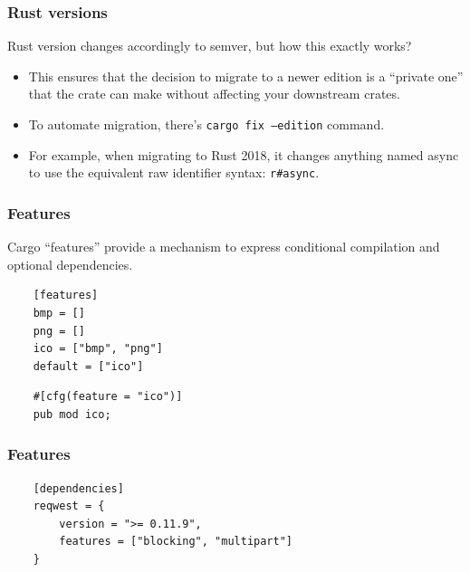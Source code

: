 \documentclass[aspectratio=1610,t]{beamer}
\begin{document}

\begin{frame}[fragile]
\frametitle{Rust versions}
Rust version changes accordingly to semver, but how this exactly works?

\begin{itemize}
    \item<1-> This ensures that the decision to migrate to a newer edition is a ``private one'' that the crate can make without affecting your downstream crates.
    \item<2-> To automate migration, there's \texttt{cargo fix --edition} command.
    \item<3-> For example, when migrating to Rust 2018, it changes anything named async to use the equivalent raw identifier syntax: \texttt{r\#async}.
\end{itemize}
\end{frame}


\begin{frame}[fragile]
\frametitle{Features}
Cargo ``features'' provide a mechanism to express conditional compilation and optional dependencies.

\begin{verbatim}
    [features]
    bmp = []
    png = []
    ico = ["bmp", "png"]
    default = ["ico"]
\end{verbatim}

\begin{verbatim}
    #[cfg(feature = "ico")]
    pub mod ico;
\end{verbatim}
\end{frame}


\begin{frame}[fragile]
\frametitle{Features}
\begin{verbatim}
    [dependencies]
    reqwest = {
        version = ">= 0.11.9",
        features = ["blocking", "multipart"]
    }
\end{verbatim}
\end{frame}

\end{document}
